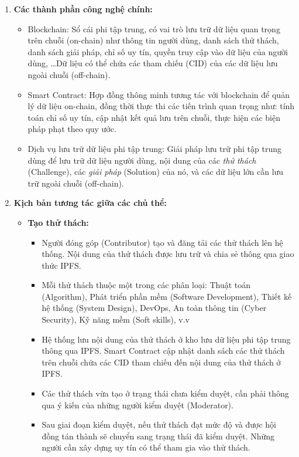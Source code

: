 \documentclass{article}[14pt]
\begin{document}
{            \begin{enumerate}[label=\textbf{\alph*.}]
                \item \textbf{Các thành phần công nghệ chính:}
                \begin{itemize}
                    \item Blockchain: Sổ cái phi tập trung, có vai trò lưu trữ dữ liệu quan trọng trên chuỗi (on-chain) như thông tin người dùng, danh sách thử thách, danh sách giải pháp, chỉ số uy tín, quyền truy cập vào dữ liệu của người dùng, \dots Dữ liệu có thể chứa các tham chiếu (CID) của các dữ liệu lưu ngoài chuỗi (off-chain). 
                    \item Smart Contract: Hợp đồng thông minh tương tác với blockchain để quản lý dữ liệu on-chain, đồng thời thực thi các tiến trình quan trọng như: tính toán chỉ số uy tín, cập nhật kết quả lưu trên chuỗi, thực hiện các biện pháp phạt theo quy ước. 
                    \item Dịch vụ lưu trữ dữ liệu phi tập trung: Giải pháp lưu trữ phi tập trung dùng để lưu trữ dữ liệu người dùng, nội dung của các \textit{thử thách} (Challenge), các \textit{giải pháp} (Solution) của nó, và các dữ liệu lớn cần lưu trữ ngoài chuỗi (off-chain).
                \end{itemize}
                    
                \item \textbf{Kịch bản tương tác giữa các chủ thể:}
                \begin{itemize}
                    \item \textbf{Tạo thử thách:}
                    \begin{itemize}
                        \item Người đóng góp (Contributor) tạo và đăng tải các thử thách lên hệ thống. Nội dung của thử thách được lưu trữ và chia sẻ thông qua giao thức IPFS.
                        \item Mỗi thử thách thuộc một trong các phân loại: Thuật toán (Algorithm), Phát triển phần mềm (Software Development), Thiết kế hệ thống (System Design), DevOps, An toàn thông tin (Cyber Security), Kỹ năng mềm (Soft skills), v.v
                        \item Hệ thống lưu nội dung của thử thách ở kho lưu dữ liệu phi tập trung thông qua IPFS. Smart Contract cập nhật danh sách các thử thách trên chuỗi chứa các CID tham chiếu đến nội dung của thử thách ở IPFS.  
                        \item Các thử thách vừa tạo ở trạng thái chưa kiểm duyệt, cần phải thông qua ý kiến của những người kiểm duyệt (Moderator). 
                        \item Sau giai đoạn kiểm duyệt, nếu thử thách đạt mức độ và được hội đồng tán thành sẽ chuyển sang trạng thái đã kiểm duyệt. Những người cần xây dựng uy tín có thể tham gia vào thử thách. 
                    \end{itemize}


\end{itemize}
\end{enumerate}}
\end{document}
